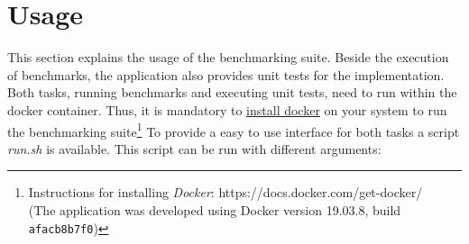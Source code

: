 \section{Usage}\label{sec:benchmarks_usage}
This section explains the usage of the benchmarking suite. Beside the execution of benchmarks, the application also provides unit tests for the implementation. Both tasks, running benchmarks and executing unit tests, need to run within the docker container. Thus, it is mandatory to \href{https://docs.docker.com/get-docker/}{install docker} on your system to run the benchmarking suite\footnote{Instructions for installing \textit{Docker}: https://docs.docker.com/get-docker/\\(The application was developed using Docker version 19.03.8, build \texttt{afacb8b7f0})}
To provide a easy to use interface for both tasks a script \textit{run.sh} is available. This script can be run with different arguments:
